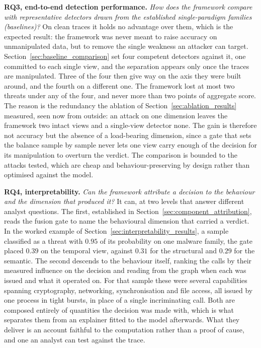 \documentclass[%
    BCOR=10mm,
    DIV=13,
    toc=bibliography,
    toc=listof,
    oneside,
    12pt,
]{scrbook}
\begin{document}
\textbf{RQ3, end-to-end detection performance.} \emph{How does the framework compare
with representative detectors drawn from the established single-paradigm families
(baselines)?} On clean traces it holds no advantage over them, which is the expected
result: the framework was never meant to raise accuracy on unmanipulated data, but to
remove the single weakness an attacker can target.
Section~\ref{sec:baseline_comparison} set four competent detectors against it, one
committed to each single view, and the separation appears only once the traces are
manipulated. Three of the four then give way on the axis they were built around, and
the fourth on a different one. The framework lost at most two threats under any of
the four, and never more than two points of aggregate score. The reason is the
redundancy the ablation of Section~\ref{sec:ablation_results} measured, seen now from
outside: an attack on one dimension leaves the framework two intact views and a
single-view detector none.
The gain is therefore not accuracy but the absence of a load-bearing dimension, since
a gate that sets the balance sample by sample never lets one view carry enough of the
decision for its manipulation to overturn the verdict. The comparison is bounded to
the attacks tested, which are cheap and behaviour-preserving by design rather than
optimised against the model.

\textbf{RQ4, interpretability.} \emph{Can the framework attribute a decision to the
behaviour and the dimension that produced it?} It can, at two levels that answer
different analyst questions. The first, established in
Section~\ref{sec:component_attribution}, reads the fusion gate to name the
behavioural dimension that carried a verdict. In the worked example of
Section~\ref{sec:interpretability_results}, a sample classified as a threat with
$0.95$ of its probability on one malware family, the gate placed $0.39$ on the
temporal view, against $0.31$ for the structural and $0.29$ for the semantic. The
second descends to the behaviour itself, ranking the calls by their measured
influence on the decision and reading from the graph when each was issued and what
it operated on. For that sample these were several capabilities spanning
cryptography, networking, synchronisation and file access, all issued by one process
in tight bursts, in place of a single incriminating call. Both are composed entirely
of quantities the decision was made with, which is what separates them from an
explainer fitted to the model afterwards. What they deliver is an account faithful
to the computation rather than a proof of cause, and one an analyst can test against
the trace.
\end{document}
